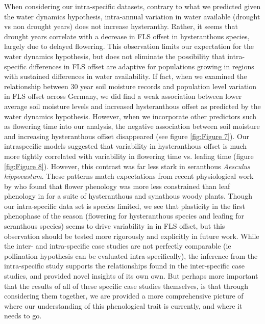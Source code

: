 \documentclass[12pt]{article}\usepackage[]{graphicx}\usepackage[]{color}
\begin{document}
\indent When considering our intra-specific datasets, contrary to what we predicted given the water dynamics hypothesis, intra-annual variation in water available (drought vs non drought years) does not increase hysteranthy. Rather, it seems that drought years correlate with a decrease in FLS offset in hysteranthous species, largely due to delayed flowering. This observation limits our expectation for the water dynamics hypothesis, but does not eliminate the possibility that intra-specific differences in FLS offset are adaptive for populations growing in regions with sustained differences in water availability. If fact, when we examined the relationship between 30 year soil moisture records and population level variation in FLS offset across Germany, we did find a weak association between lower average soil moisture levels and increased hysteranthous offset as predicted by the water dynamics hypothesis. However, when we incorporate other predictors such as flowering time into our analysis, the negative association between soil moisture and increasing hysteranthous offset disappeared (see figure \ref{fig:Figure 7}). Our intraspecific models suggested that variability in hysteranthous offset is much more tightly correlated with variability in flowering time vs. leafing time (figure \ref{fig:Figure 8}). However, this contrast was far less stark in seranthous \textit{Aesculus hippocastum}. These patterns match expectations from recent physiological work by \citet{Savage2019} who found that flower phenology was more less constrained than leaf phenology in for a suite of hysteranthous and synathous woody plants. Though our intra-specific data set is species limited, we see that plasticity in the first phenophase of the season (flowering for hysteranthous species and leafing for seranthous species) seems to drive variability in in FLS offset, but this observation should be tested more rigorously and explicitly in future work. While the inter- and intra-specific case studies are not perfectly comparable (ie pollination hypothesis can be evaluated intra-specifically), the inference from the intra-specific study supports the relationships found in the inter-specific case studies, and provided novel insights of its own own. But perhaps more important that the results of all of these specific case studies themselves, is that through considering them together, we are provided a more comprehensive picture of where our understanding of this phenological trait is currently, and where it needs to go. 
\end{document}
